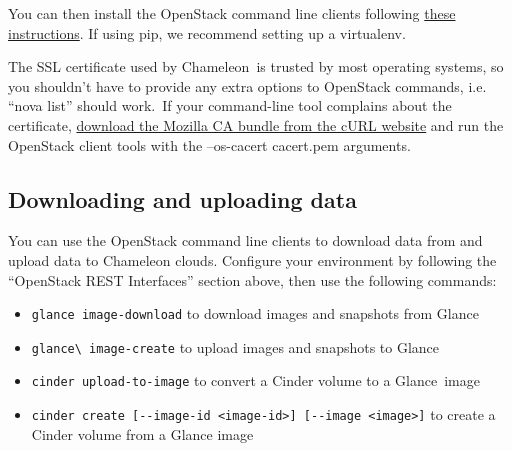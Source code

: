 You can then install the OpenStack command line clients following
\href{http://docs.openstack.org/user-guide/common/cli_install_openstack_command_line_clients.html}{these
instructions}. If using pip, we recommend setting up a virtualenv.

The SSL certificate used by Chameleon~is trusted by most operating
systems, so you shouldn't have to provide any extra options to OpenStack
commands, i.e. ``nova list'' should work.~If your command-line tool
complains about the certificate,
\href{http://curl.haxx.se/docs/caextract.html}{download the Mozilla CA
bundle from the cURL website} and run the OpenStack client tools with
the --os-cacert cacert.pem arguments.

\subsection{Downloading and uploading data}\label{downloading-and-uploading-data}

You can use the OpenStack command line clients to download data from and
upload data to Chameleon clouds. Configure your environment by following
the ``OpenStack REST Interfaces'' section above, then use the following
commands:

\begin{itemize}
\item
  \verb|glance image-download| to download images and snapshots from
  Glance
\item
  \verb|glance\ image-create| to upload images and snapshots to Glance
\item
  \verb|cinder upload-to-image| to convert a Cinder volume to a
  Glance~image
\item
  \verb|cinder create [--image-id <image-id>] [--image <image>]|
  to create a Cinder volume from a Glance image
\end{itemize}


